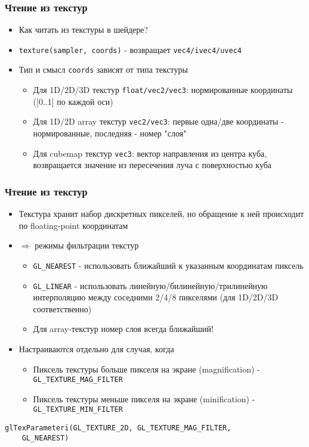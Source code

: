 \documentclass{beamer}
\begin{document}
\begin{frame}[fragile]
\frametitle{Чтение из текстур}
\begin{itemize}
\item Как читать из текстуры в шейдере?
\pause
\item \verb|texture(sampler, coords)| - возвращает \verb|vec4/ivec4/uvec4|
\pause
\item Тип и смысл \verb|coords| зависят от типа текстуры
\pause
\begin{itemize}
\item Для 1D/2D/3D текстур \verb|float/vec2/vec3|: нормированные координаты ([0..1] по каждой оси)
\pause
\item Для 1D/2D array текстур \verb|vec2/vec3|: первые одна/две координаты - нормированные, последняя - номер "слоя"
\pause
\item Для cubemap текстур \verb|vec3|: вектор направления из центра куба, возвращается значение из пересечения луча с поверхностью куба
\end{itemize}
\end{itemize}
\end{frame}

\begin{frame}[fragile]
\frametitle{Чтение из текстур}
\begin{itemize}
\item Текстура хранит набор дискретных пикселей, но обращение к ней происходит по floating-point координатам
\pause
\item \begin{math}\Rightarrow\end{math} режимы фильтрации текстур
\begin{itemize}
\item \verb|GL_NEAREST| - использовать ближайший к указанным координатам пиксель
\item \verb|GL_LINEAR| - использовать линейную/билинейную/трилинейную интерполяцию между соседними 2/4/8 пикселями (для 1D/2D/3D соответственно)
\item Для array-текстур номер слоя всегда ближайший!
\end{itemize}
\pause
\item Настраиваются отдельно для случая, когда
\begin{itemize}
\item Пиксель текстуры больше пикселя на экране (magnification) - \verb|GL_TEXTURE_MAG_FILTER|
\item Пиксель текстуры меньше пикселя на экране (minification) - \verb|GL_TEXTURE_MIN_FILTER|
\end{itemize}
\end{itemize}
\pause
\begin{verbatim}
glTexParameteri(GL_TEXTURE_2D, GL_TEXTURE_MAG_FILTER,
    GL_NEAREST)
\end{verbatim}
\end{frame}
\end{document}
